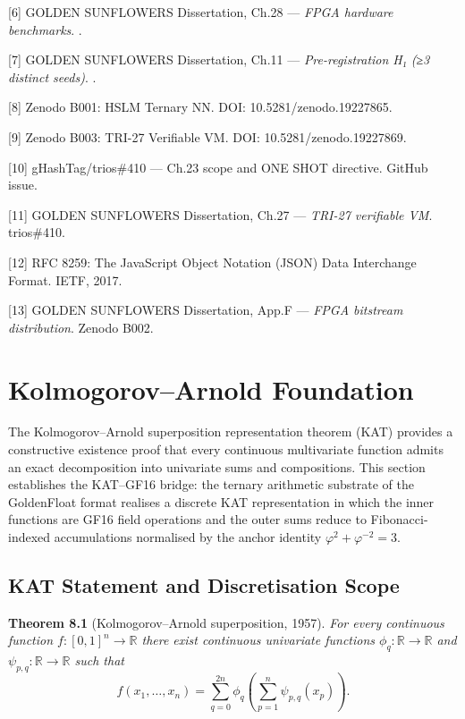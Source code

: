 [6] GOLDEN SUNFLOWERS Dissertation, Ch.28 ---
\emph{FPGA hardware benchmarks}.
.

[7] GOLDEN SUNFLOWERS Dissertation, Ch.11 ---
\emph{Pre-registration H₁ (≥3 distinct seeds)}.
.

[8] Zenodo B001: HSLM Ternary NN. DOI:
10.5281/zenodo.19227865.

[9] Zenodo B003: TRI-27 Verifiable VM. DOI:
10.5281/zenodo.19227869.

[10] gHashTag/trios\#410 --- Ch.23 scope and
ONE SHOT directive. GitHub issue.

[11] GOLDEN SUNFLOWERS Dissertation, Ch.27 ---
\emph{TRI-27 verifiable VM}. trios\#410.

[12] RFC 8259: The JavaScript Object Notation
(JSON) Data Interchange Format. IETF, 2017.

[13] GOLDEN SUNFLOWERS Dissertation, App.F ---
\emph{FPGA bitstream distribution}. Zenodo B002.

\section{Kolmogorov--Arnold Foundation}\label{fa_23:kolmogorov-arnold-foundation}

The Kolmogorov--Arnold superposition representation
theorem (KAT) provides a constructive existence
proof that every continuous multivariate function
admits an exact decomposition into univariate
sums and compositions. This section establishes
the KAT--GF16 bridge: the ternary arithmetic
substrate of the GoldenFloat format realises a
discrete KAT representation in which the inner
functions are GF16 field operations and the outer
sums reduce to Fibonacci-indexed accumulations
normalised by the anchor identity
\(\varphi^2 + \varphi^{-2} = 3\).

\subsection{KAT Statement and Discretisation
Scope}\label{fa_23:kat-statement}

\textbf{Theorem 8.1} (Kolmogorov--Arnold
superposition, 1957). \emph{For every continuous
function \(f\colon [0,1]^n \to \mathbb{R}\) there
exist continuous univariate functions
\(\phi_{q}\colon \mathbb{R} \to \mathbb{R}\) and
\(\psi_{p,q}\colon \mathbb{R} \to \mathbb{R}\)
such that}
\[
f(x_1, \ldots, x_n) = \sum_{q=0}^{2n} \phi_q\!\left(\sum_{p=1}^{n} \psi_{p,q}(x_p)\right).
\]

